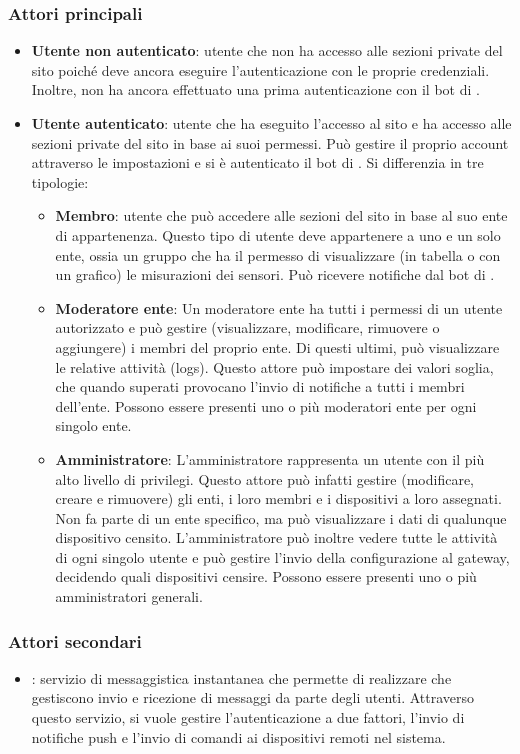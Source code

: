 		\subsubsection{Attori principali}
		\begin{itemize}
			\item \textbf{Utente non autenticato}: utente che non ha accesso alle sezioni private del sito poiché deve ancora eseguire l'autenticazione con le proprie credenziali. Inoltre, non ha ancora effettuato una prima autenticazione con il bot di .

			\item \textbf{Utente autenticato}: utente che ha eseguito l'accesso al sito e ha accesso alle sezioni private del sito in base ai suoi permessi. Può gestire il proprio account attraverso le impostazioni e si è autenticato il bot di . Si differenzia in tre tipologie:

			\begin{itemize}
				\item \textbf{Membro}: utente che può accedere alle sezioni del sito in base al suo ente di appartenenza. Questo tipo di utente deve appartenere a uno e un solo ente, ossia un gruppo che ha il permesso di visualizzare (in tabella o con un grafico) le misurazioni dei sensori. Può ricevere notifiche dal bot di .

				\item \textbf{Moderatore ente}: Un moderatore ente ha tutti i permessi di un utente autorizzato e può gestire (visualizzare, modificare, rimuovere o aggiungere) i membri del proprio ente. Di questi ultimi, può visualizzare le relative attività (logs).
				Questo attore può impostare dei valori soglia, che quando superati provocano l'invio di notifiche a tutti i membri dell'ente.
				Possono essere presenti uno o più moderatori ente per ogni singolo ente.

				\item \textbf{Amministratore}: L'amministratore rappresenta un utente con il più alto livello di privilegi. Questo attore può infatti gestire (modificare, creare e rimuovere) gli enti, i loro membri e i dispositivi a loro assegnati. Non fa parte di un ente specifico, ma può visualizzare i dati di qualunque dispositivo censito. 
				L'amministratore può inoltre vedere tutte le attività di ogni singolo utente e può gestire l'invio della configurazione al gateway, decidendo quali dispositivi censire.
				Possono essere presenti uno o più amministratori generali.
			\end{itemize}
		\end{itemize}
		\subsubsection{Attori secondari}
			\begin{itemize}
				\item {}: servizio di messaggistica instantanea che permette di realizzare  che gestiscono invio e ricezione di messaggi da parte degli utenti. Attraverso questo servizio, si vuole gestire l'autenticazione a due fattori, l'invio di notifiche push e l'invio di comandi ai dispositivi remoti nel sistema.
			\end{itemize}
	